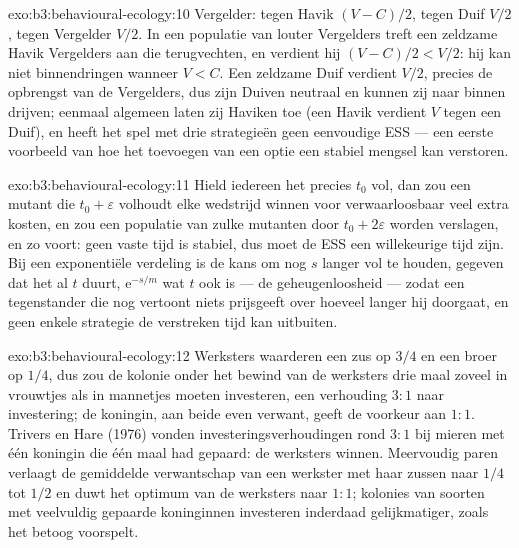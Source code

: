 \begin{solution}{exo:b3:behavioural-ecology:10}
Vergelder: tegen Havik $(V - C)/2$, tegen Duif $V/2$, tegen Vergelder
$V/2$. In een populatie van louter Vergelders treft een zeldzame Havik
Vergelders aan die terugvechten, en verdient hij $(V - C)/2 < V/2$: hij
kan niet binnendringen wanneer $V < C$. Een zeldzame Duif verdient
$V/2$, precies de opbrengst van de Vergelders, dus zijn Duiven neutraal
en kunnen zij naar binnen drijven; eenmaal algemeen laten zij Haviken
toe (een Havik verdient $V$ tegen een Duif), en heeft het spel met drie
strategieën geen eenvoudige ESS --- een eerste voorbeeld van hoe het
toevoegen van een optie een stabiel mengsel kan verstoren.
\end{solution}

\begin{solution}{exo:b3:behavioural-ecology:11}
Hield iedereen het precies $t_{0}$ vol, dan zou een mutant die $t_{0} +
\varepsilon$ volhoudt elke wedstrijd winnen voor verwaarloosbaar veel
extra kosten, en zou een populatie van zulke mutanten door $t_{0} + 2\varepsilon$
worden verslagen, en zo voort: geen vaste tijd is stabiel, dus moet de
ESS een willekeurige tijd zijn. Bij een exponentiële verdeling is de
kans om nog $s$ langer vol te houden, gegeven dat het al $t$ duurt,
$\mathrm{e}^{-s/m}$ wat $t$ ook is --- de geheugenloosheid --- zodat
een tegenstander die nog vertoont niets prijsgeeft over hoeveel langer
hij doorgaat, en geen enkele strategie de verstreken tijd kan uitbuiten.
\end{solution}

\begin{solution}{exo:b3:behavioural-ecology:12}
Werksters waarderen een zus op $3/4$ en een broer op $1/4$, dus zou de
kolonie onder het bewind van de werksters drie maal zoveel in vrouwtjes
als in mannetjes moeten investeren, een verhouding $3{:}1$ naar
investering; de koningin, aan beide even verwant, geeft de voorkeur aan
$1{:}1$. Trivers en Hare (1976) vonden investeringsverhoudingen rond
$3{:}1$ bij mieren met één koningin die één maal had gepaard: de
werksters winnen. Meervoudig paren verlaagt de gemiddelde verwantschap
van een werkster met haar zussen naar $1/4$ tot $1/2$ en duwt het
optimum van de werksters naar $1{:}1$; kolonies van soorten met
veelvuldig gepaarde koninginnen investeren inderdaad gelijkmatiger,
zoals het betoog voorspelt.
\end{solution}

